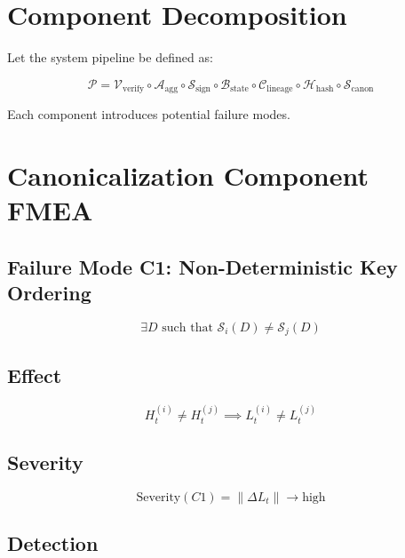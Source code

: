 \section{Component Decomposition}

Let the system pipeline be defined as:

\begin{equation}
\mathcal{P} = \mathcal{V}_{\text{verify}} \circ \mathcal{A}_{\text{agg}} \circ \mathcal{S}_{\text{sign}} \circ \mathcal{B}_{\text{state}} \circ \mathcal{C}_{\text{lineage}} \circ \mathcal{H}_{\text{hash}} \circ \mathcal{S}_{\text{canon}}
\end{equation}

Each component introduces potential failure modes.

\section{Canonicalization Component FMEA}

\subsection{Failure Mode C1: Non-Deterministic Key Ordering}

\begin{equation}
\exists D \text{ such that } \mathcal{S}_i(D) \neq \mathcal{S}_j(D)
\end{equation}

\subsection{Effect}

\begin{equation}
H_t^{(i)} \neq H_t^{(j)} \implies L_t^{(i)} \neq L_t^{(j)}
\end{equation}

\subsection{Severity}

\begin{equation}
\text{Severity}(C1) = \|\Delta L_t\| \rightarrow \text{high}
\end{equation}

\subsection{Detection}

